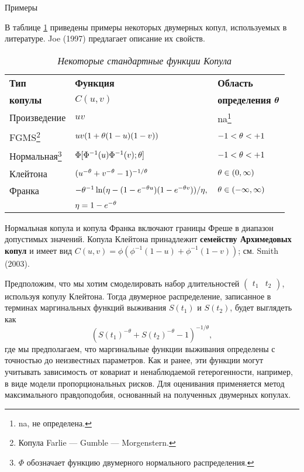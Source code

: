         \begin{center}Примеры\end{center}
        \noindent

В таблице \ref{tab:19.1} приведены примеры некоторых двумерных копул, используемых в литературе. Joe (1997) предлагает описание их свойств.

    \begin{table}[!htbp]\caption{\textit{Некоторые стандартные функции Копула}}\label{tab:19.1}
    \begin{center}
\begin{minipage}{12cm}
\begin{tabular}{lll}
\hline \hline
\textbf{Тип}                   &   \textbf{Функция}                         &\textbf{Область}\\
\textbf{копулы}                & $C(u, v)$                                  &\textbf{определения} $\bm{\theta}$\\
\hline
Произведение    
&$uv$                                                       
&na\footnote{na, не определена.} \\
FGMS\footnote{Копула Farlie --- Gumble --- Morgenstern.}        
&$uv(1 + \theta(1 - u)(1 - v))$                                       
&$-1 < \theta < +1$ \\
Нормальная\footnote{$\Phi$ обозначает функцию двумерного нормального распределения.}  
&$\Phi[\Phi^{-1}(u) \Phi^{-1}(v);\theta]$                             
&$-1 < \theta < +1$\\
Клейтона        
&$(u^{-\theta} + v^{-\theta} - 1)^{-1/\theta}$                           
&$\theta \in (0, \infty)$\\
Франка         
&$-\theta^{-1}\ln(\eta - (1 - e^{-\theta u})(1 - e^{-\theta v}))/\eta,$   
&$\theta \in (-\infty, \infty)$\\
&$\eta = 1 - e^{-\theta}$\\
\hline \hline
\end{tabular}
\end{minipage}
    \end{center}
    \end{table}

Нормальная копула и копула Франка включают границы Фреше в диапазон допустимых значений. Копула Клейтона принадлежит \textbf{семейству Архимедовых копул} и имеет вид $C(u, v) = \phi (\phi^{-1}(1 - u) + \phi^{-1}(1 - v))$; см. Smith (2003).

Предположим, что мы хотим смоделировать набор длительностей $\begin{pmatrix} t_1 & t_2 \end{pmatrix}$, используя копулу Клейтона. Тогда двумерное распределение, записанное в терминах маргинальных функций выживания $S(t_1)$ и $S(t_2)$, будет выглядеть как
    $$(S(t_1)^{-\theta} + S(t_2)^{-\theta} - 1)^{-1/\theta},$$
где мы предполагаем, что маргинальные функции выживания определены с точностью до неизвестных параметров. Как и ранее, эти функции могут учитывать зависимость от ковариат и ненаблюдаемой гетерогенности, например, в виде модели пропорциональных рисков. Для оценивания применяется метод максимального правдоподобия, основанный на полученных двумерных копулах.

